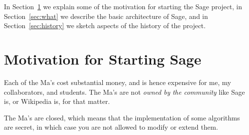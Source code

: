 \documentclass[multi]{cambridge7A}
\theoremstyle{plain}%
\theoremstyle{definition}
\begin{document}
In Section~\ref{section:why} we explain some of the motivation for
starting the Sage project, in Section~\ref{sec:what} we describe the
basic architecture of Sage, and in Section~\ref{sec:history} we
sketch aspects of the history of the project.

\section{Motivation for Starting Sage}
\label{section:why}

Each of the Ma's cost substantial money, and is hence expensive for
me, my collaborators, and students.  The Ma's are not {\em owned by
  the community} like Sage is, or Wikipedia is,  for that matter.

The Ma's are closed, which means that the implementation of some
algorithms are secret, in which case you are not allowed to modify or
extend them.  
\end{document}
